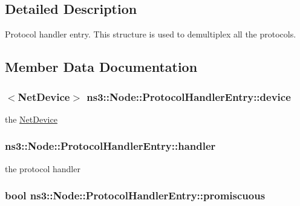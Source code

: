 \subsection{Detailed Description}
Protocol handler entry. This structure is used to demultiplex all the protocols. 

\subsection{Member Data Documentation}
\subsubsection[{\texorpdfstring{device}{device}}]{$<${\bf Net\+Device}$>$ ns3\+::\+Node\+::\+Protocol\+Handler\+Entry\+::device}\hypertarget{structns3_1_1Node_1_1ProtocolHandlerEntry_a7e963acf05dc4dec486049a6b13c8bbb}{}\label{structns3_1_1Node_1_1ProtocolHandlerEntry_a7e963acf05dc4dec486049a6b13c8bbb}


the \hyperlink{classns3_1_1NetDevice}{Net\+Device} 

\subsubsection[{\texorpdfstring{handler}{handler}}]{ ns3\+::\+Node\+::\+Protocol\+Handler\+Entry\+::handler}\hypertarget{structns3_1_1Node_1_1ProtocolHandlerEntry_a954976c90430c990716a78f0ed1c0ce6}{}\label{structns3_1_1Node_1_1ProtocolHandlerEntry_a954976c90430c990716a78f0ed1c0ce6}


the protocol handler 

\subsubsection[{\texorpdfstring{promiscuous}{promiscuous}}]{\setlength{\rightskip}{0pt plus 5cm}bool ns3\+::\+Node\+::\+Protocol\+Handler\+Entry\+::promiscuous}\hypertarget{structns3_1_1Node_1_1ProtocolHandlerEntry_a0ce7e76b4105d29f2248bfd9b33620cc}{}\label{structns3_1_1Node_1_1ProtocolHandlerEntry_a0ce7e76b4105d29f2248bfd9b33620cc}


